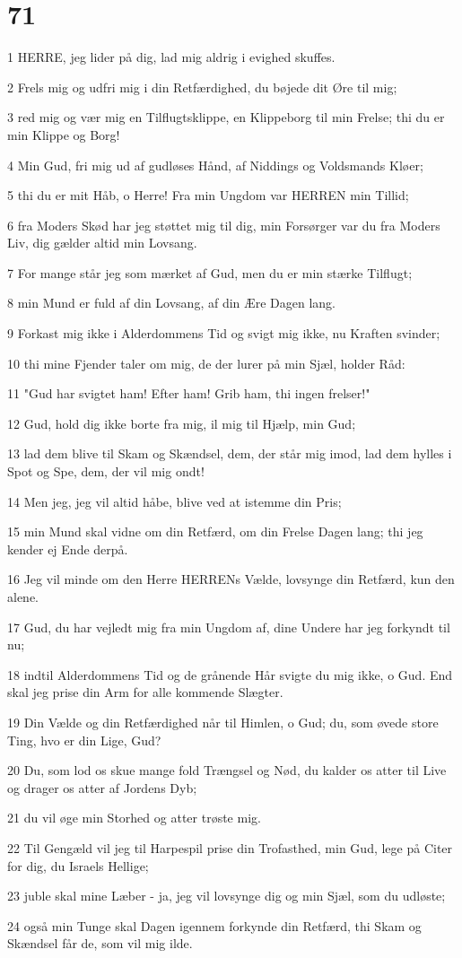 \chapter{71}

\par 1 HERRE, jeg lider på dig, lad mig aldrig i evighed skuffes.
\par 2 Frels mig og udfri mig i din Retfærdighed, du bøjede dit Øre til mig;
\par 3 red mig og vær mig en Tilflugtsklippe, en Klippeborg til min Frelse; thi du er min Klippe og Borg!
\par 4 Min Gud, fri mig ud af gudløses Hånd, af Niddings og Voldsmands Kløer;
\par 5 thi du er mit Håb, o Herre! Fra min Ungdom var HERREN min Tillid;
\par 6 fra Moders Skød har jeg støttet mig til dig, min Forsørger var du fra Moders Liv, dig gælder altid min Lovsang.
\par 7 For mange står jeg som mærket af Gud, men du er min stærke Tilflugt;
\par 8 min Mund er fuld af din Lovsang, af din Ære Dagen lang.
\par 9 Forkast mig ikke i Alderdommens Tid og svigt mig ikke, nu Kraften svinder;
\par 10 thi mine Fjender taler om mig, de der lurer på min Sjæl, holder Råd:
\par 11 "Gud har svigtet ham! Efter ham! Grib ham, thi ingen frelser!"
\par 12 Gud, hold dig ikke borte fra mig, il mig til Hjælp, min Gud;
\par 13 lad dem blive til Skam og Skændsel, dem, der står mig imod, lad dem hylles i Spot og Spe, dem, der vil mig ondt!
\par 14 Men jeg, jeg vil altid håbe, blive ved at istemme din Pris;
\par 15 min Mund skal vidne om din Retfærd, om din Frelse Dagen lang; thi jeg kender ej Ende derpå.
\par 16 Jeg vil minde om den Herre HERRENs Vælde, lovsynge din Retfærd, kun den alene.
\par 17 Gud, du har vejledt mig fra min Ungdom af, dine Undere har jeg forkyndt til nu;
\par 18 indtil Alderdommens Tid og de grånende Hår svigte du mig ikke, o Gud. End skal jeg prise din Arm for alle kommende Slægter.
\par 19 Din Vælde og din Retfærdighed når til Himlen, o Gud; du, som øvede store Ting, hvo er din Lige, Gud?
\par 20 Du, som lod os skue mange fold Trængsel og Nød, du kalder os atter til Live og drager os atter af Jordens Dyb;
\par 21 du vil øge min Storhed og atter trøste mig.
\par 22 Til Gengæld vil jeg til Harpespil prise din Trofasthed, min Gud, lege på Citer for dig, du Israels Hellige;
\par 23 juble skal mine Læber - ja, jeg vil lovsynge dig og min Sjæl, som du udløste;
\par 24 også min Tunge skal Dagen igennem forkynde din Retfærd, thi Skam og Skændsel får de, som vil mig ilde.

